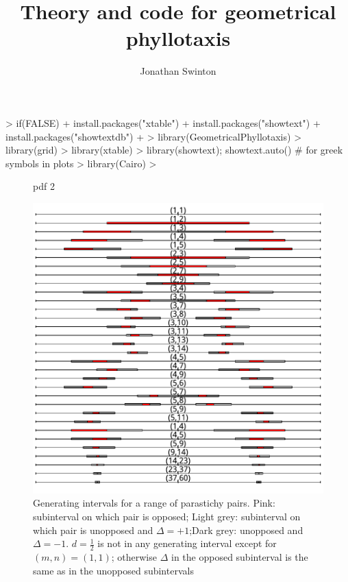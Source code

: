 \documentclass[a4paper]{article}
\newcommand{\jhalf}{\textstyle{\frac{1}{2}}}
\begin{document}


\title{Theory and code for geometrical phyllotaxis}
\author{Jonathan Swinton}
\maketitle

\begin{Schunk}
\begin{Sinput}
> if(FALSE) {
+   install.packages("xtable")
+   install.packages("showtext")
+   install.packages("showtextdb")
+ }
> library(GeometricalPhyllotaxis)
> library(grid)
> library(xtable)
> library(showtext); showtext.auto() # for greek symbols in plots
> library(Cairo)
> 
\end{Sinput}
\end{Schunk}




\begin{center}
\begin{figure}[H]
\begin{Schunk}
\begin{Soutput}
pdf 
  2 
\end{Soutput}
\end{Schunk}
\includegraphics{figdir/fig-gi}
\caption{Generating intervals for a range of parastichy pairs.  Pink: subinterval on which pair is opposed; Light grey: subinterval on which pair is unopposed and $\Delta=+1$;Dark grey: unopposed and $\Delta=-1$. $d=\jhalf$ is not in any generating interval except for $(m,n)=(1,1)$; otherwise $\Delta$ in the opposed subinterval is the same as in the unopposed subintervals}
\label{fig:ogi}
\end{figure}
\end{center}
\end{document}
